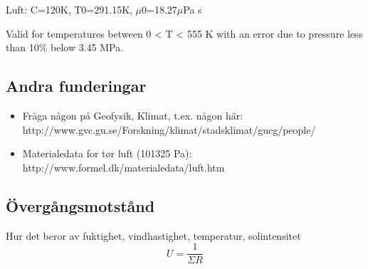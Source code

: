 Luft: C=120K, T0=291.15K, $\mu$0=18.27$\mu$Pa s

Valid for temperatures between 0 < T < 555 K with an error due to pressure less than 10\% below 3.45 MPa.

\subsection{Andra funderingar}
\begin{itemize}
\item[] Fråga någon på Geofysik, Klimat, t.ex. någon här: \\
http://www.gvc.gu.se/Forskning/klimat/stadsklimat/gucg/people/
\item[] Materialedata for tør luft (101325 Pa): http://www.formel.dk/materialedata/luft.htm
\end{itemize}

\subsection{Övergångsmotstånd}
Hur det beror av fuktighet, vindhastighet, temperatur, solintensitet
\begin{equation}
U=\frac{1}{\Sigma R}
\end{equation}